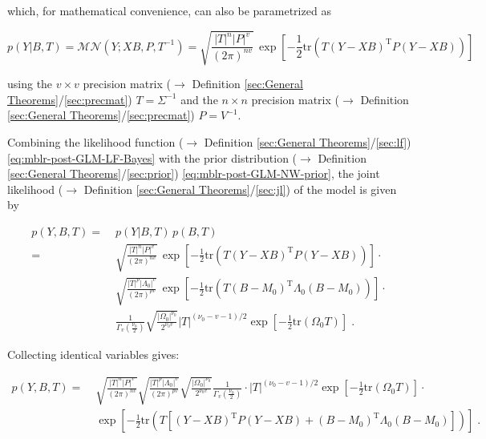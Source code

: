\documentclass[a4paper,12pt,twoside]{book}
\begin{document}
which, for mathematical convenience, can also be parametrized as

\begin{equation} \label{eq:mblr-post-GLM-LF-Bayes}
p(Y|B,T) = \mathcal{MN}(Y; X B, P, T^{-1}) = \sqrt{\frac{|T|^n |P|^v}{(2 \pi)^{nv}}} \, \exp\left[ -\frac{1}{2} \mathrm{tr}\left( T (Y-XB)^\mathrm{T} P (Y-XB) \right) \right]
\end{equation}

using the $v \times v$ precision matrix ($\rightarrow$ Definition \ref{sec:General Theorems}/\ref{sec:precmat}) $T = \Sigma^{-1}$ and the $n \times n$ precision matrix ($\rightarrow$ Definition \ref{sec:General Theorems}/\ref{sec:precmat}) $P = V^{-1}$.

\vspace{1em}
Combining the likelihood function ($\rightarrow$ Definition \ref{sec:General Theorems}/\ref{sec:lf}) \eqref{eq:mblr-post-GLM-LF-Bayes} with the prior distribution ($\rightarrow$ Definition \ref{sec:General Theorems}/\ref{sec:prior}) \eqref{eq:mblr-post-GLM-NW-prior}, the joint likelihood ($\rightarrow$ Definition \ref{sec:General Theorems}/\ref{sec:jl}) of the model is given by

\begin{equation} \label{eq:mblr-post-GLM-NW-JL-s1}
\begin{split}
p(Y,B,T) = \; & p(Y|B,T) \, p(B,T) \\
= \; & \sqrt{\frac{|T|^n |P|^v}{(2 \pi)^{nv}}} \, \exp\left[ -\frac{1}{2} \mathrm{tr}\left( T (Y-XB)^\mathrm{T} P (Y-XB) \right) \right] \cdot \\
& \sqrt{\frac{|T|^p |\Lambda_0|^v}{(2 \pi)^{pv}}} \, \exp\left[ -\frac{1}{2} \mathrm{tr}\left( T (B-M_0)^\mathrm{T} \Lambda_0 (B-M_0) \right) \right] \cdot \\
& \frac{1}{\Gamma_v \left( \frac{\nu_0}{2} \right)} \sqrt{\frac{|\Omega_0|^{\nu_0}}{2^{\nu_0 v}}} |T|^{(\nu_0-v-1)/2} \exp\left[ -\frac{1}{2} \mathrm{tr}\left( \Omega_0 T \right) \right] \; .
\end{split}
\end{equation}

Collecting identical variables gives:

\begin{equation} \label{eq:mblr-post-GLM-NW-JL-s2}
\begin{split}
p(Y,B,T) = \; & \sqrt{\frac{|T|^n |P|^v}{(2 \pi)^{nv}}} \sqrt{\frac{|T|^p |\Lambda_0|^v}{(2 \pi)^{pv}}} \sqrt{\frac{|\Omega_0|^{\nu_0}}{2^{\nu_0 v}}} \frac{1}{\Gamma_v \left( \frac{\nu_0}{2} \right)} \cdot |T|^{(\nu_0-v-1)/2} \exp\left[ -\frac{1}{2} \mathrm{tr}\left( \Omega_0 T \right) \right] \cdot \\
& \exp\left[ -\frac{1}{2} \mathrm{tr}\left( T \left[ (Y-XB)^\mathrm{T} P (Y-XB) + (B-M_0)^\mathrm{T} \Lambda_0 (B-M_0) \right] \right) \right] \; .
\end{split}
\end{equation}
\end{document}

